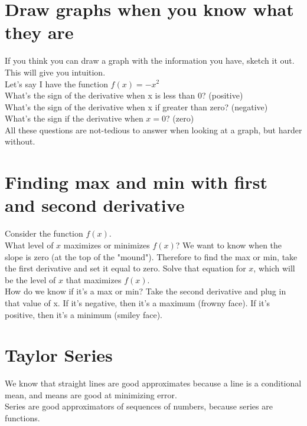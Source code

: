 \documentclass{article}
\begin{document}
\section{Draw graphs when you know what they are}
If you think you can draw a graph with the information you have, sketch it out. This will give you intuition. \\

Let's say I have the function $f(x) = -x^2$\\ 

What's the sign of the derivative when x is less than 0? (positive) \\

What's the sign of the derivative when x if greater than zero? (negative) \\

What's the sign if the derivative when $x = 0$? (zero)\\

All these questions are not-tedious to answer when looking at a graph, but harder without. 

\section{Finding max and min with first and second derivative}

Consider the function $f(x)$. \\

What level of $x$ maximizes or minimizes $f(x)$? We want to know when the slope is zero (at the top of the "mound"). Therefore to find the max or min, take the first derivative and set it equal to zero. Solve that equation for $x$, which will be the level of $x$ that maximizes $f(x)$. \\

How do we know if it's a max or min? Take the second derivative and plug in that value of x. If it's negative, then it's a maximum (frowny face). If it's positive, then it's a minimum (smiley face). 

\section{Taylor Series}

We know that straight lines are good approximates because a line is a conditional mean, and means are good at minimizing error.\\

Series are good approximators of sequences of numbers, because series are functions. \\
\end{document}
